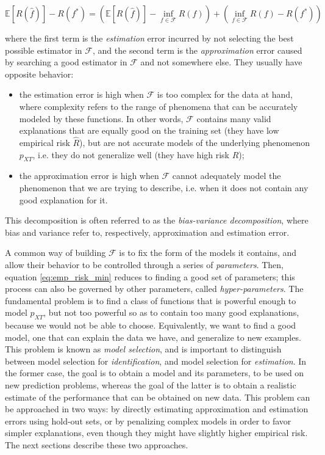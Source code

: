 \documentclass[a4paper]{book}
\begin{document}
\begin{equation}
\mathbb{E}[R(\hat{f})]-R(f^*)=
\left(\mathbb{E}[R(\hat{f})]-\inf_{f\in\mathcal{F}} R(f)\right)
+\left(\inf_{f\in\mathcal{F}} R(f)-R(f^*)\right)
\end{equation}

\noindent where the first term is the \emph{estimation} error incurred by not selecting the best possible estimator in $\mathcal{F}$, and the second term is the \emph{approximation} error caused by searching a good estimator in $\mathcal{F}$ and not somewhere else. They usually have opposite behavior:

\begin{itemize}
\item the estimation error is high when $\mathcal{F}$ is too complex for the data at hand, where complexity refers to the range of phenomena that can be accurately modeled by these functions. In other words, $\mathcal{F}$ contains many valid explanations that are equally good on the training set (they have low empirical risk $\hat{R}$), but are not accurate models of the underlying phenomenon $p_{XT}$, i.e. they do not generalize well (they have high risk $R$);
\item the approximation error is high when $\mathcal{F}$ cannot adequately model the phenomenon that we are trying to describe, i.e. when it does not contain any good explanation for it.
\end{itemize}

This decomposition is often referred to as the \emph{bias-variance decomposition}, where bias and variance refer to, respectively, approximation and estimation error.

A common way of building $\mathcal{F}$ is to fix the form of the models it contains, and allow their behavior to be controlled through a series of \emph{parameters}. Then, equation \ref{eq:emp_risk_min} reduces to finding a good set of parameters; this process can also be governed by other parameters, called \emph{hyper-parameters}. The fundamental problem is to find a class of functions that is powerful enough to model $p_{XT}$, but not too powerful so as to contain too many good explanations, because we would not be able to choose. Equivalently, we want to find a good model, one that can explain the data we have, and generalize to new examples. This problem is known as \emph{model selection}, and is important to distinguish between model selection for \emph{identification}, and model selection for \emph{estimation}. In the former case, the goal is to obtain a model and its parameters, to be used on new prediction problems, whereas the goal of the latter is to obtain a realistic estimate of the performance that can be obtained on new data. This problem can be approached in two ways: by directly estimating approximation and estimation errors using hold-out sets, or by penalizing complex models in order to favor simpler explanations, even though they might have slightly higher empirical risk. The next sections describe these two approaches.
\end{document}
